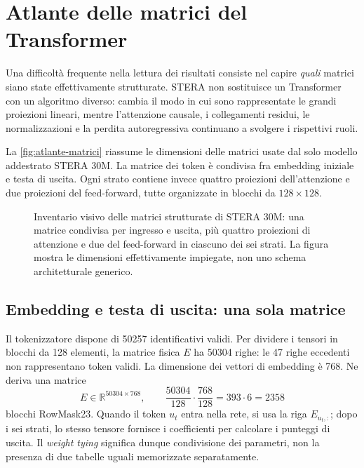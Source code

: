
\section{Atlante delle matrici del Transformer}
\label{sec:atlante-matrici}

Una difficoltà frequente nella lettura dei risultati consiste nel capire \emph{quali} matrici siano state effettivamente strutturate. STERA non sostituisce un Transformer con un algoritmo diverso: cambia il modo in cui sono rappresentate le grandi proiezioni lineari, mentre l'attenzione causale, i collegamenti residui, le normalizzazioni e la perdita autoregressiva continuano a svolgere i rispettivi ruoli.

La \autoref{fig:atlante-matrici} riassume le dimensioni delle matrici usate dal solo modello addestrato STERA 30M. La matrice dei token è condivisa fra embedding iniziale e testa di uscita. Ogni strato contiene invece quattro proiezioni dell'attenzione e due proiezioni del feed-forward, tutte organizzate in blocchi da $128\times128$.

\begin{figure}[htbp]
\centering

\caption{Inventario visivo delle matrici strutturate di STERA 30M: una matrice condivisa per ingresso e uscita, più quattro proiezioni di attenzione e due del feed-forward in ciascuno dei sei strati. La figura mostra le dimensioni effettivamente impiegate, non uno schema architetturale generico.}
\label{fig:atlante-matrici}
\end{figure}

\subsection{Embedding e testa di uscita: una sola matrice}

Il tokenizzatore dispone di \num{50257} identificativi validi. Per dividere i tensori in blocchi da 128 elementi, la matrice fisica $E$ ha \num{50304} righe: le 47 righe eccedenti non rappresentano token validi. La dimensione dei vettori di embedding è 768. Ne deriva una matrice
\[
E\in\mathbb{R}^{50304\times768},
\qquad
\frac{50304}{128}\cdot\frac{768}{128}=393\cdot6=2358
\]
blocchi RowMask23. Quando il token $u_t$ entra nella rete, si usa la riga $E_{u_t,:}$; dopo i sei strati, lo stesso tensore fornisce i coefficienti per calcolare i punteggi di uscita. Il \emph{weight tying} significa dunque condivisione dei parametri, non la presenza di due tabelle uguali memorizzate separatamente.

